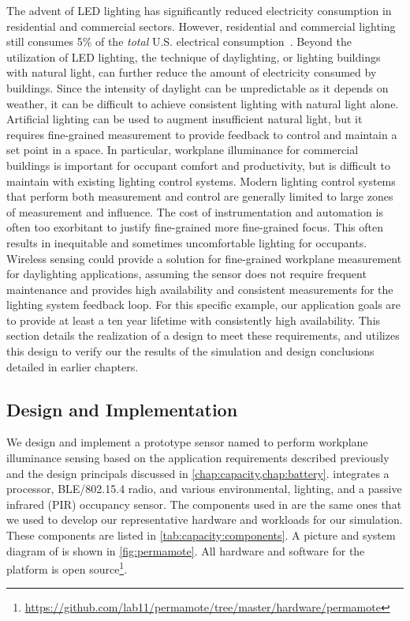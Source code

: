 The advent of LED lighting has significantly reduced electricity consumption in residential and commercial sectors. However, residential and commercial lighting still consumes 5\% of the \textit{total} U.S. electrical consumption~\cite{aeo2022}.
Beyond the utilization of LED lighting, the technique of daylighting, or lighting buildings with natural light, can further reduce the amount of electricity consumed by buildings. 
Since the intensity of daylight can be unpredictable as it depends on weather, it can be difficult to achieve consistent lighting with natural light alone.
Artificial lighting can be used to augment insufficient natural light, but it requires fine-grained measurement to provide feedback to control and maintain a set point in a space.
In particular, workplane illuminance for commercial buildings is important for occupant comfort and productivity, but is difficult to maintain with existing lighting control systems. 
Modern lighting control systems that perform both measurement and control are generally limited to large zones of measurement and influence. 
The cost of instrumentation and automation is often too exorbitant to justify fine-grained more fine-grained focus.
This often results in inequitable and sometimes uncomfortable lighting for occupants.
Wireless sensing could provide a solution for fine-grained workplane measurement for daylighting applications, assuming the sensor does not require frequent maintenance and provides high availability and consistent measurements for the lighting system feedback loop.
For this specific example, our application goals are to provide at least a ten year lifetime with consistently high availability. 
This section details the realization of a design to meet these requirements, and utilizes this design to verify our the results of the simulation and design conclusions detailed in earlier chapters.


\subsection{Design and Implementation}
We design and implement a prototype sensor named \name to perform workplane illuminance sensing based on the application requirements described previously and the design principals discussed in \cref{chap:capacity,chap:battery}.
\name integrates a processor, BLE/802.15.4 radio, and various environmental, lighting,
and a passive infrared (PIR) occupancy sensor.
The components used in \name are the same ones that we used to develop our representative hardware and workloads for our simulation. 
These components are listed in \cref{tab:capacity:components}. 
A picture
and system diagram of \name is shown in \cref{fig:permamote}. All hardware
and software for the platform is open source\footnote{\url{https://github.com/lab11/permamote/tree/master/hardware/permamote}}.

